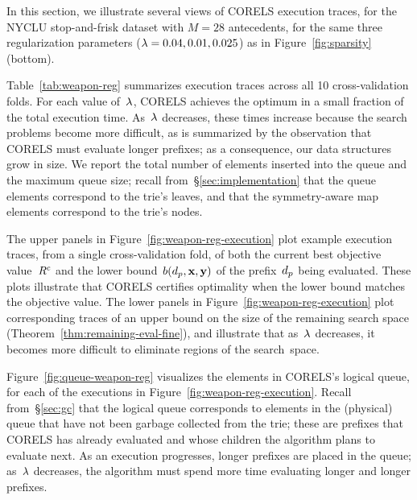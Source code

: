 In this section, we illustrate several views of CORELS execution traces,
for the NYCLU stop-and-frisk dataset with ${M = 28}$ antecedents,
for the same three regularization parameters (${{\lambda} = 0.04, 0.01, 0.025}$)
as in Figure~\ref{fig:sparsity} (bottom).

Table~\ref{tab:weapon-reg} summarizes execution traces across all 10 cross-validation folds.
%
For each value of~${\lambda}$, CORELS achieves the optimum in a small fraction of the total execution time.
%
As~${\lambda}$ decreases, these times increase because the search problems become more difficult,
as is summarized by the observation that CORELS must evaluate longer prefixes;
as a consequence, our data structures grow in size.
%
We report the total number of elements inserted into the queue and the maximum queue size;
recall from~\S\ref{sec:implementation} that the queue elements correspond to the trie's leaves,
and that the symmetry-aware map elements correspond to the trie's nodes.

The upper panels in Figure~\ref{fig:weapon-reg-execution} plot example execution traces,
from a single cross-validation fold, of both the current best objective value~${R^c}$
and the lower bound~$b(d_p, \mathbf{x}, \mathbf{y})$ of the prefix~$d_p$ being evaluated.
%
These plots illustrate that CORELS certifies optimality
when the lower bound matches the objective value.
%
The lower panels in Figure~\ref{fig:weapon-reg-execution} plot corresponding traces of
an upper bound on the size of the remaining search space (Theorem~\ref{thm:remaining-eval-fine}),
and illustrate that as~${\lambda}$ decreases, it becomes more difficult to eliminate regions of the search~space.

Figure~\ref{fig:queue-weapon-reg} visualizes the elements in CORELS's logical queue,
for each of the executions in Figure~\ref{fig:weapon-reg-execution}.
%
Recall from~\S\ref{sec:gc} that the logical queue corresponds to elements in the
(physical) queue that have not been garbage collected from the trie; these are prefixes that
CORELS has already evaluated and whose children the algorithm plans to evaluate next.
%
As an execution progresses, longer prefixes are placed in the queue;
as~${\lambda}$ decreases, the algorithm must spend more time evaluating longer and longer prefixes.

